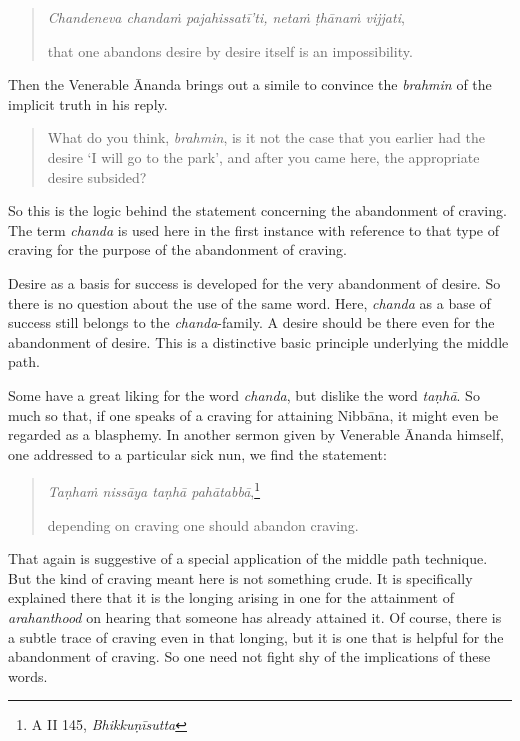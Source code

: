 \begin{quote}
\emph{Chandeneva chandaṁ pajahissatī'ti, netaṁ ṭhānaṁ vijjati},

that one abandons desire by desire itself is an impossibility.
\end{quote}

Then the Venerable Ānanda brings out a simile to convince the \emph{brahmin} of the implicit truth in his reply.

\begin{quote}
What do you think, \emph{brahmin}, is it not the case that you earlier had the desire `I will go to the park', and after you came here, the appropriate desire subsided?
\end{quote}

So this is the logic behind the statement concerning the abandonment of craving. The term \emph{chanda} is used here in the first instance with reference to that type of craving for the purpose of the abandonment of craving.

Desire as a basis for success is developed for the very abandonment of desire. So there is no question about the use of the same word. Here, \emph{chanda} as a base of success still belongs to the \emph{chanda}-family. A desire should be there even for the abandonment of desire. This is a distinctive basic principle underlying the middle path.

Some have a great liking for the word \emph{chanda}, but dislike the word \emph{taṇhā}. So much so that, if one speaks of a craving for attaining Nibbāna, it might even be regarded as a blasphemy. In another sermon given by Venerable Ānanda himself, one addressed to a particular sick nun, we find the statement:

\begin{quote}
\emph{Taṇhaṁ nissāya taṇhā pahātabbā},\footnote{A II 145, \emph{Bhikkuṇīsutta}}

depending on craving one should abandon craving.
\end{quote}

That again is suggestive of a special application of the middle path technique. But the kind of craving meant here is not something crude. It is specifically explained there that it is the longing arising in one for the attainment of \emph{arahanthood} on hearing that someone has already attained it. Of course, there is a subtle trace of craving even in that longing, but it is one that is helpful for the abandonment of craving. So one need not fight shy of the implications of these words.

